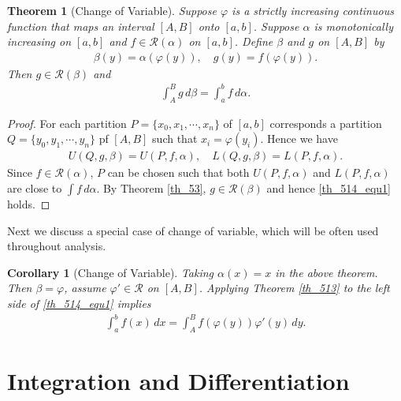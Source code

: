 \documentclass[11pt]{book}
\newtheorem{theorem}{Theorem}[chapter]
\newtheorem{corollary}{Corollary}[theorem]
\theoremstyle{definition}
\numberwithin{equation}{chapter}
\begin{document}
\medskip

\begin{theorem}[Change of Variable]\label{th_514}
Suppose $\varphi$ is a strictly increasing continuous function that maps an interval $[A,B]$ onto $[a,b]$. Suppose $\alpha$ is monotonically increasing on $[a,b]$ and $f \in \mathscr{R}(\alpha)$ on $[a,b]$. Define $\beta$ and $g$ on $[A,B]$ by 
\begin{align*}
    \beta(y) = \alpha(\varphi(y)), \quad g(y) = f(\varphi(y)).
\end{align*}
Then $g \in \mathscr{R}(\beta)$ and
\begin{align}\label{th_514_equ1}
    \int^B_A g \,d\beta = \int^b_a f \,d\alpha.
\end{align}
\end{theorem}
\begin{proof}
For each partition $P = \{x_0,x_1,\cdots,x_n\}$ of $[a,b]$ corresponds a partition $Q = \{y_0,y_1,\cdots,y_n\}$ pf $[A,B]$ such that $x_i = \varphi(y_i)$. Hence we have
\begin{align*}
    U(Q,g,\beta) = U(P,f,\alpha),  \quad L(Q,g,\beta) = L(P,f,\alpha).
\end{align*}
Since $f \in \mathscr{R}(\alpha)$, $P$ can be chosen such that both $U(P,f,\alpha)$ and $L(P,f,\alpha)$ are close to $\int f \,d\alpha$. By Theorem \ref{th_53}, $g \in \mathscr{R}(\beta)$ and hence \eqref{th_514_equ1} holds.
\end{proof}

\medskip

Next we discuss a special case of change of variable, which will be often used throughout analysis.

\medskip

\begin{corollary}[Change of Variable]\label{coro_5141}
Taking $\alpha(x) = x$ in the above theorem. Then $\beta = \varphi$, assume $\varphi' \in \mathscr{R}$ on $[A,B]$. Applying Theorem \ref{th_513} to the left side of \eqref{th_514_equ1} implies
\begin{align*}
    \int^b_a f(x) \,dx = \int^B_A f(\varphi(y)) \varphi'(y) \,dy.
\end{align*}
\end{corollary}

\medskip



\section{Integration and Differentiation}
\end{document}
